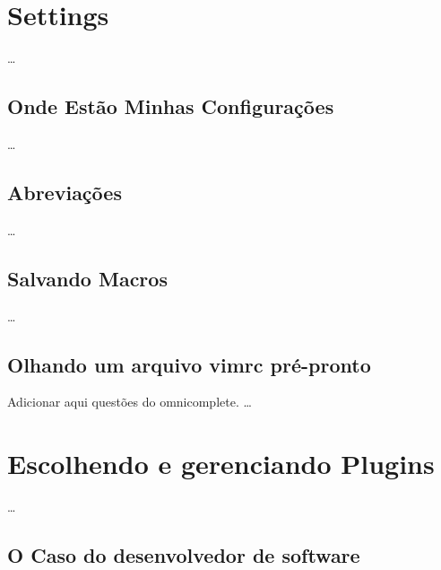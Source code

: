 \documentclass[a4paper,12pt,oneside]{book}
\begin{document}





\newcommand{\vimcommand}[1]{%
    \sethlcolor{black}%
    \textbf{\textcolor{white}{\hl{#1}}}%
}
\newcommand{\vimkeys}[1]{%
    \sethlcolor{black}%
    \textbf{\textcolor{red}{\hl{#1}}}%
}
\newcommand{\insertfigure}[3]{
\begin{figure}[!htb]
\centering
\fbox{\texttt{[image: \#2]}}
\caption{#3}
\end{figure}
}










\chapter{Settings}
\ldots
\section{Onde Estão Minhas Configurações}
\ldots
\section{Abreviações}
\ldots
\section{Salvando Macros}
\ldots
\section{Olhando um arquivo vimrc pré-pronto}
Adicionar aqui questões do omnicomplete.
\ldots


\newpage
\chapter{Escolhendo e gerenciando Plugins}
\ldots
\section{O Caso do desenvolvedor de software}
\end{document}
